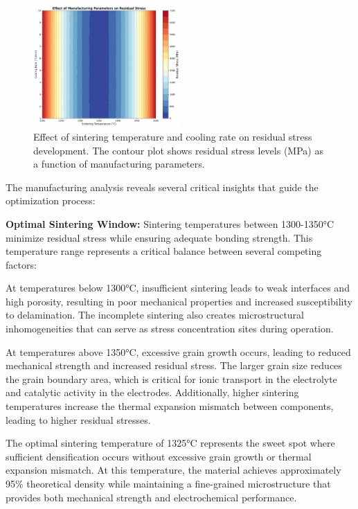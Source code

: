 \documentclass[conference]{IEEEtran}
\begin{document}
\begin{figure}[htbp]
\centering
\includegraphics[width=0.5\textwidth]{manufacturing_effects.png}
\caption{Effect of sintering temperature and cooling rate on residual stress development. The contour plot shows residual stress levels (MPa) as a function of manufacturing parameters.}
\label{fig:manufacturing_effects}
\end{figure}

The manufacturing analysis reveals several critical insights that guide the optimization process:

\textbf{Optimal Sintering Window:} Sintering temperatures between 1300-1350°C minimize residual stress while ensuring adequate bonding strength. This temperature range represents a critical balance between several competing factors:

At temperatures below 1300°C, insufficient sintering leads to weak interfaces and high porosity, resulting in poor mechanical properties and increased susceptibility to delamination. The incomplete sintering also creates microstructural inhomogeneities that can serve as stress concentration sites during operation.

At temperatures above 1350°C, excessive grain growth occurs, leading to reduced mechanical strength and increased residual stress. The larger grain size reduces the grain boundary area, which is critical for ionic transport in the electrolyte and catalytic activity in the electrodes. Additionally, higher sintering temperatures increase the thermal expansion mismatch between components, leading to higher residual stresses.

The optimal sintering temperature of 1325°C represents the sweet spot where sufficient densification occurs without excessive grain growth or thermal expansion mismatch. At this temperature, the material achieves approximately 95\% theoretical density while maintaining a fine-grained microstructure that provides both mechanical strength and electrochemical performance.
\end{document}
